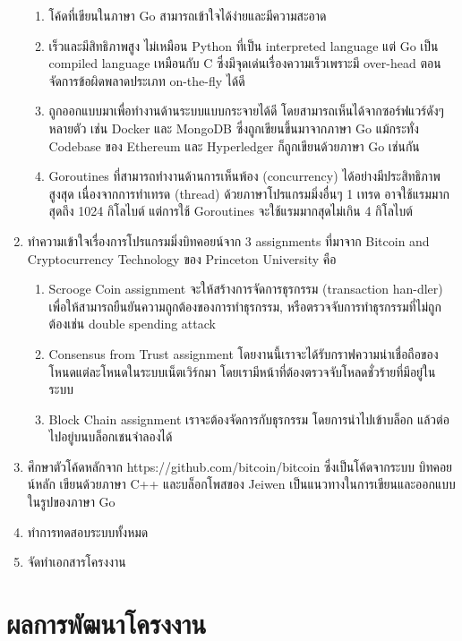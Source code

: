 \documentclass[letterpaper, 10pt, conference]{ieeeconf}
\begin{document}
\begin{enumerate}
	\begin{enumerate}
		\item โค้ดที่เขียนในภาษา Go สามารถเข้าใจได้ง่ายและมีความสะอาด
		\item เร็วและมีสิทธิภาพสูง ไม่เหมือน Python ที่เป็น interpreted language แต่ Go เป็น compiled language เหมือนกับ C ซึ่งมีจุดเด่นเรื่องความเร็วเพราะมี over-head ตอนจัดการข้อผิดพลาดประเภท on-the-fly ได้ดี
		\item ถูกออกแบบมาเพื่อทำงานด้านระบบแบบกระจายได้ดี โดยสามารถเห็นได้จากซอร์ฟแวร์ดังๆหลายตัว เช่น Docker และ MongoDB ซึ่งถูกเขียนขึ้นมาจากภาษา Go แม้กระทั่ง Codebase ของ Ethereum และ Hyperledger ก็ถูกเขียนด้วยภาษา Go เช่นกัน
		\item Goroutines ที่สามารถทำงานด้านการเห็นพ้อง (concurrency) ได้อย่างมีประสิทธิภาพสูงสุด เนื่องจากการทำเทรด (thread) ด้วยภาษาโปรแกรมมิ่งอื่นๆ 1 เทรด อาจใช้แรมมากสุดถึง 1024 กิโลไบต์ แต่การใช้ Goroutines จะใช้แรมมากสุดไม่เกิน 4 กิโลไบต์
	\end{enumerate}
	\item ทำความเข้าใจเรื่องการโปรแกรมมิ่งบิทคอยน์จาก 3 assignments ที่มาจาก Bitcoin and Cryptocurrency Technology ของ Princeton University คือ
	\begin{enumerate}
		\item Scrooge Coin assignment จะให้สร้างการจัดการธุรกรรม (transaction han-dler) เพื่อให้สามารถยืนยันความถูกต้องของการทำธุรกรรม, หรือตรวจจับการทำธุรกรรมที่ไม่ถูกต้องเช่น double spending attack
		\item Consensus from Trust assignment โดยงานนี้เราจะได้รับกราฟความน่าเชื่อถือของโหนดแต่ละโหนดในระบบเน็ตเวิร์กมา โดยเรามีหน้าที่ต้องตรวจจับโหลดชั่วร้ายที่มีอยู๋ในระบบ
		\item Block Chain assignment เราจะต้องจัดการกับธุรกรรม โดยการนำไปเข้าบล็อก แล้วต่อไปอยู่บนบล็อกเชนจำลองได้
	\end{enumerate}
	\item ศึกษาตัวโค้ดหลักจาก https://github.com/bitcoin/bitcoin ซึ่งเป็นโค้ดจากระบบ บิทคอยน์หลัก เขียนด้วยภาษา C++  และบล็อกโพสของ Jeiwen เป็นแนวทางในการเขียนและออกแบบในรูปของภาษา Go
	\item ทำการทดสอบระบบทั้งหมด
	\item จัดทำเอกสารโครงงาน
\end{enumerate}

\section{ผลการพัฒนาโครงงาน}
\end{document}
